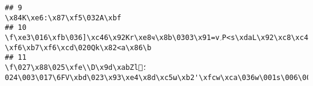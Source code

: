 \documentclass[
]{article}
\begin{document}
\begin{verbatim}
## 9                                                                                                                                                                                                                                                                                                                                                                                                                                                                                                                                                                                                                                                                                                                                                                                                                                                                                 \x84K\xe6:\x87\xf5\032A\xbf
## 10                                                                                                                                                                                                                                                                                              \f\xe3\016\xfb\036]\xc46\x92Kr\xe8ҹ\x8b\0303\x91=v؍P<s\xdaL\x92\xc8\xc4~&\016!E\x91w\x83I\027|\x8f\xd9;D=C\034P\xb21ܷ\t\xb6\xc2\xfdf\xb8\005\xe4j\x9a\x94'\x88\xfae\xce\035\xb1\xbc\x8c\x99\xbd\037\027t\x82\xb0\x8be\xda<\xb6ص͉3;:\xf3\xa9\x95ڻ\030St\x8c\xc6\030{\xb7>sX\xd0a3\xcb\xe7\xb9\xd1W`\x95\035\xecJ\xac+\xc8\xceU\xf5\x9c`\001e\x92\xaak\xd6)r\x97\b+e\xf7\xf1\x94m\xb0goq\x82x\026(\x89\021ߤ\xf9\032D\xddJ]8\xe5\x9cTz\x9d\x8e\016M\xe05\002\xe5\037\xe4\x8b\xd3)\xd7\005\xe80\x92\xbb\xbfI\xeb\x8d\bYg\x97z\026\xee|]p+~o\xb3\xc7`_\xde=\xed\xbe\004\031|j\031 \xf6\xb7\xf6\xcd\020Qk\x82<a\x86\b
## 11                                                                                                                                                                                                                                                                                                                                                                                                                                                                                                                                                                                                                                                                                                                                                   \f\027݂\x88\025\xfe\\D\x9d\xabZl؛6\017\003\024FV\xbd\023\x93\xe4\x8d\xc5ω\xb2'\xfcw\xca\036w\001s\006\005\x8f[\xf1\xfb\x94:\x9b(e\xe7D\x81\xb3\t\xf7\037

\end{verbatim}
\end{document}

